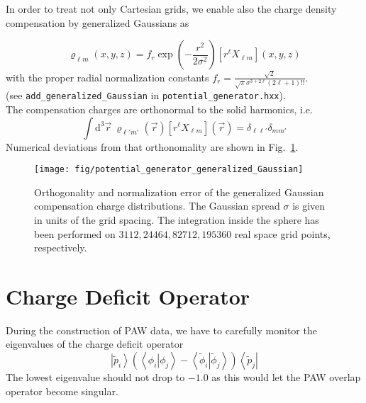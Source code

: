 \documentclass[oribibl]{llncs}
\newcommand{\m}[1]{{\mathrm{#1}}}
\newcommand{\ttt}[1]{\texttt{#1}}
\newcommand{\ket}[1]{\left| #1 \right\rangle}
\newcommand{\bra}[1]{\left\langle #1 \right|}
\newcommand{\braket}[2]{\left\langle \left. #1 \right| #2 \right\rangle}
\begin{document}
In order to treat not only Cartesian grids, we enable also the charge density compensation by generalized Gaussians as

$$ \varrho_{\ell m}(x,y,z) = f_r \exp\left(-\frac{r^2}{2\sigma^2}\right) [r^\ell X_{\ell m}](x,y,z) $$
with the proper radial normalization constants $f_r = \frac{\sqrt{2}}{\sqrt{\pi} \sigma^{3 + 2\ell} (2\ell + 1)!!}$.
\\(see \ttt{add\_generalized\_Gaussian} in \ttt{potential\_generator.hxx}).\\
The compensation charges are orthonormal to the solid harmonics, i.e.
$$ \int\m d^3\vec r \ \varrho_{\ell' m'}(\vec r) [r^\ell X_{\ell m}](\vec r) = \delta_{\ell\ell'}\delta_{mm'} $$
Numerical deviations from that orthonomality are shown in Fig.~\ref{fig:generalized-Gaussian-error}.

\begin{figure} [h]
  \centering
  \begin{minipage}[c]{.990\textwidth}
	\texttt{[image: fig/potential\_generator\_generalized\_Gaussian]} %
  \end{minipage}\hfill
  \begin{minipage}[c]{.009\textwidth}
  \end{minipage}
  \caption{Orthogonality and normalization error of the generalized Gaussian compensation charge distributions.
  The Gaussian spread $\sigma$ is given in units of the grid spacing. The integration inside
  the sphere has been performed on $3 112, 24 464, 82 712, 195 360$ real space grid points, respectively.
  } \label{fig:generalized-Gaussian-error}
\end{figure}


\section*{Charge Deficit Operator}

During the construction of PAW data, we have to carefully monitor the eigenvalues of the charge deficit operator
$$ \ket{\tilde p_i} \left( \braket{\phi_i}{\phi_j} - \braket{\tilde \phi_i}{\tilde \phi_j} \right) \bra{\tilde p_j} $$
The lowest eigenvalue should not drop to $-1.0$ as this would let the PAW overlap operator become singular.
\end{document}
